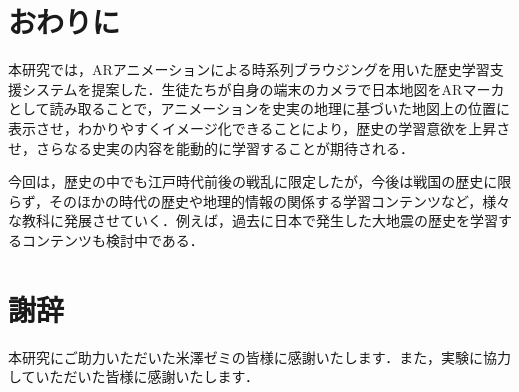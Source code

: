 \documentclass[a4paper,dvipdfmx]{hisken}
\begin{document}
\section{おわりに}

本研究では，ARアニメーションによる時系列ブラウジングを用いた歴史学習支援システムを提案した．生徒たちが自身の端末のカメラで日本地図をARマーカとして読み取ることで，アニメーションを史実の地理に基づいた地図上の位置に表示させ，わかりやすくイメージ化できることにより，歴史の学習意欲を上昇させ，さらなる史実の内容を能動的に学習することが期待される．

今回は，歴史の中でも江戸時代前後の戦乱に限定したが，今後は戦国の歴史に限らず，そのほかの時代の歴史や地理的情報の関係する学習コンテンツなど，様々な教科に発展させていく．例えば，過去に日本で発生した大地震の歴史を学習するコンテンツも検討中である．


\section*{謝辞}
本研究にご助力いただいた米澤ゼミの皆様に感謝いたします．また，実験に協力していただいた皆様に感謝いたします．





\end{document}
